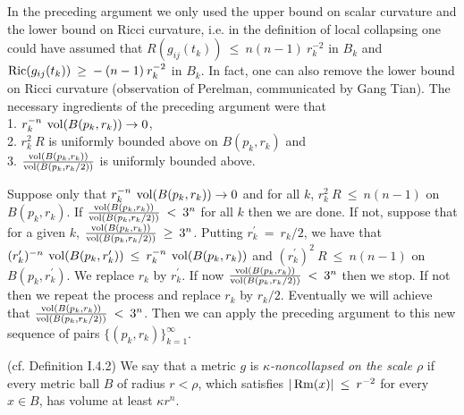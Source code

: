 \begin{remark}
  \label{rem:kl-no-local-collapsing-theorem-i-estimates-scalar-curvature}

In the preceding argument we only used the upper bound on scalar
curvature and the lower bound on Ricci
curvature, i.e. in the definition
of local collapsing one could have assumed that
$R(g_{ij}(t_k)) \: \le \: n(n-1) \: r_k^{-2}$ in $B_k$ and
$\operatorname{Ric}(g_{ij}(t_k)) \: \ge \: - \: (n-1) \: r_k^{-2}$ in $B_k$.
In fact, one can also remove the lower bound on Ricci curvature
(observation of Perelman, communicated by Gang Tian).
The necessary ingredients of the preceding argument were that \\
1. $r_k^{-n} \: \operatorname{vol}(B(p_k, r_k)) \rightarrow 0$, \\
2. $r_k^2 \: R$ is uniformly bounded above on $B(p_k, r_k)$ and \\
3. $\frac{\operatorname{vol}(B(p_k, r_k))}{\operatorname{vol}(B(p_k, r_k/2))}$ is uniformly bounded above.

Suppose only that $r_k^{-n} \: \operatorname{vol}(B(p_k, r_k)) \rightarrow 0$ and
for all $k$, $r_k^2 \: R \: \le \: n(n-1)$ on $B(p_k, r_k)$. If
$\frac{\operatorname{vol}(B(p_k, r_k))}{\operatorname{vol}(B(p_k, r_k/2))} \: < \: 3^n$ for all
$k$ then we are done.  If not, suppose that for a given $k$,
$\frac{\operatorname{vol}(B(p_k, r_k))}{\operatorname{vol}(B(p_k, r_k/2))} \: \ge \: 3^n$.
Putting $r_k^\prime \: = \: r_k/2$, we have that
$(r_k^\prime)^{-n} \: \operatorname{vol}(B(p_k, r_k^\prime)) \: \le \:
r_k^{-n} \: \operatorname{vol}(B(p_k, r_k))$ and
$(r_k^\prime)^2 \: R \: \le \: n(n-1)$ on $B(p_k, r_k^\prime)$.
We replace $r_k$ by $r_k^\prime$. If now
$\frac{\operatorname{vol}(B(p_k, r_k))}{\operatorname{vol}(B(p_k, r_k/2))} \: < \: 3^n$ then we
stop. If not then we repeat the process and replace $r_k$ by $r_k/2$.
Eventually we will achieve that
$\frac{\operatorname{vol}(B(p_k, r_k))}{\operatorname{vol}(B(p_k, r_k/2))} \: < \: 3^n$.
Then we can apply the preceding argument to this new sequence of pairs
$\{(p_k, r_k)\}_{k=1}^\infty$.
\end{remark}

\begin{definition}
  \label{def:kl-no-local-collapsing-theorem-i-kappa-noncollapsing}
 \label{noncollapsed1} (cf. Definition I.4.2)
We say that a metric $g$ is {\em $\kappa$-noncollapsed on the scale
$\rho$} if every metric ball $B$ of radius $r < \rho$, which satisfies
$|\operatorname{Rm}(x)| \: \le \: r^{-2}$ for every $x \in B$, has volume at least
$\kappa r^n$.
\end{definition}

